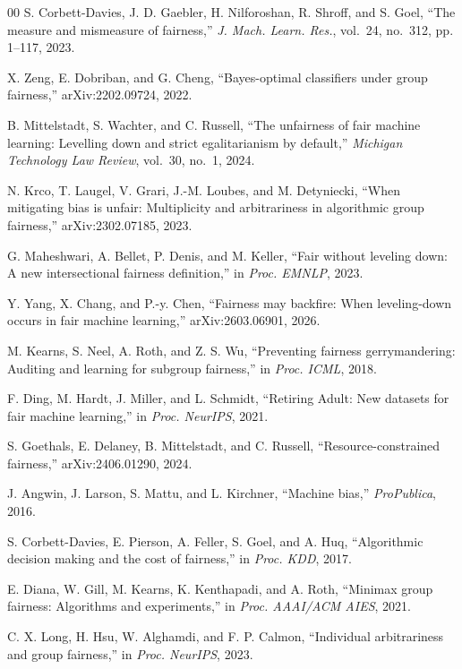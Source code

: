 \documentclass[conference]{IEEEtran}
\begin{document}
\begin{thebibliography}{00}
 S. Corbett-Davies, J. D. Gaebler, H. Nilforoshan, R. Shroff, and
S. Goel, ``The measure and mismeasure of fairness,'' \emph{J. Mach. Learn. Res.}, vol.~24,
no.~312, pp. 1--117, 2023.

 X. Zeng, E. Dobriban, and G. Cheng, ``Bayes-optimal classifiers under
group fairness,'' arXiv:2202.09724, 2022.

 B. Mittelstadt, S. Wachter, and C. Russell, ``The unfairness of fair
machine learning: Levelling down and strict egalitarianism by default,'' \emph{Michigan
Technology Law Review}, vol.~30, no.~1, 2024.

 N. Krco, T. Laugel, V. Grari, J.-M. Loubes, and M. Detyniecki, ``When
mitigating bias is unfair: Multiplicity and arbitrariness in algorithmic group fairness,''
arXiv:2302.07185, 2023.

 G. Maheshwari, A. Bellet, P. Denis, and M. Keller, ``Fair without
leveling down: A new intersectional fairness definition,'' in \emph{Proc. EMNLP}, 2023.

 Y. Yang, X. Chang, and P.-y. Chen, ``Fairness may backfire: When
leveling-down occurs in fair machine learning,'' arXiv:2603.06901, 2026.

 M. Kearns, S. Neel, A. Roth, and Z. S. Wu, ``Preventing fairness
gerrymandering: Auditing and learning for subgroup fairness,'' in \emph{Proc. ICML}, 2018.

 F. Ding, M. Hardt, J. Miller, and L. Schmidt, ``Retiring Adult: New datasets
for fair machine learning,'' in \emph{Proc. NeurIPS}, 2021.

 S. Goethals, E. Delaney, B. Mittelstadt, and C. Russell,
``Resource-constrained fairness,'' arXiv:2406.01290, 2024.

 J. Angwin, J. Larson, S. Mattu, and L. Kirchner, ``Machine bias,''
\emph{ProPublica}, 2016.

 S. Corbett-Davies, E. Pierson, A. Feller, S. Goel, and A. Huq,
``Algorithmic decision making and the cost of fairness,'' in \emph{Proc. KDD}, 2017.

 E. Diana, W. Gill, M. Kearns, K. Kenthapadi, and A. Roth, ``Minimax group
fairness: Algorithms and experiments,'' in \emph{Proc. AAAI/ACM AIES}, 2021.

 C. X. Long, H. Hsu, W. Alghamdi, and F. P. Calmon, ``Individual
arbitrariness and group fairness,'' in \emph{Proc. NeurIPS}, 2023.


\end{thebibliography}
\end{document}
